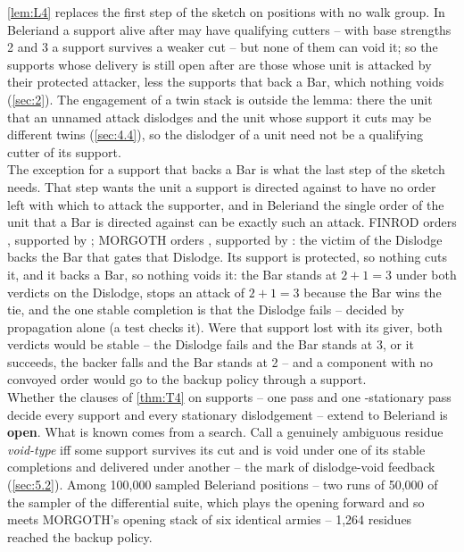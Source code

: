 \documentclass[12pt,a4paper]{article}
\begin{document}
\cref{lem:L4} replaces the first step of the sketch on positions with no walk group.
In Beleriand a support alive after  may have qualifying cutters -- with base strengths 2 and 3 a support survives a weaker cut -- but none of them can void it; so the supports whose delivery is still open after  are those whose unit is attacked by their protected attacker, less the supports that back a Bar, which nothing voids (\cref{sec:2}).
The engagement of a twin stack is outside the lemma: there the unit that an unnamed attack dislodges and the unit whose support it cuts may be different twins (\cref{sec:4.4}), so the dislodger of a unit need not be a qualifying cutter of its support.\\
The exception for a support that backs a Bar is what the last step of the sketch needs.
That step wants the unit a support is directed against to have no order left with which to attack the supporter, and in Beleriand the single order of the unit that a Bar is directed against can be exactly such an attack.
FINROD orders , supported by ; MORGOTH orders , supported by : the victim of the Dislodge backs the Bar that gates that Dislodge.
Its support is protected, so nothing cuts it, and it backs a Bar, so nothing voids it: the Bar stands at $2 + 1 = 3$ under both verdicts on the Dislodge, stops an attack of $2 + 1 = 3$ because the Bar wins the tie, and the one stable completion is that the Dislodge fails -- decided by propagation alone (a test checks it).
Were that support lost with its giver, both verdicts would be stable -- the Dislodge fails and the Bar stands at 3, or it succeeds, the backer falls and the Bar stands at 2 -- and a component with no convoyed order would go to the backup policy through a support.\\
Whether the clauses of \cref{thm:T4} on supports -- one  pass and one -stationary pass decide every support and every stationary dislodgement -- extend to Beleriand is \textbf{open}.
What is known comes from a search.
Call a genuinely ambiguous residue \emph{void-type} iff some support survives its cut and is void under one of its stable completions and delivered under another -- the mark of dislodge-void feedback (\cref{sec:5.2}).
Among 100,000 sampled Beleriand positions -- two runs of 50,000 of the sampler of the differential suite, which plays the opening forward and so meets MORGOTH's opening stack of six identical armies -- 1,264 residues reached the backup policy.
\end{document}
